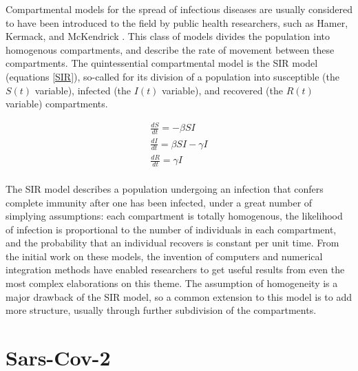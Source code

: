 Compartmental models for the spread of infectious diseases are usually considered to have been introduced to the field by public health researchers, such as Hamer, Kermack, and McKendrick \cite{hamer1906epidemic, kermack1927contribution, brauer2019mathematical,edelstein2005mathematical}. This class of models divides the population into homogenous compartments, and describe the rate of movement between these compartments. The quintessential compartmental model is the SIR model (equations \ref{SIR}), so-called for its division of a population into susceptible (the $S(t)$ variable), infected (the $I(t)$ variable), and recovered (the $R(t)$ variable) compartments.

\begin{eqnarray}
    \frac{dS}{dt} = -\beta S I  \\
    \frac{dI}{dt} = \beta S I - \gamma I\\
    \frac{dR}{dt} = \gamma I\\
    \label{SIR}
\end{eqnarray}

The SIR model describes a population undergoing an infection that confers complete immunity after one has been infected, under a great number of simplying assumptions: each compartment is totally homogenous, the likelihood of infection is proportional to the number of individuals in each compartment, and the probability that an individual recovers is constant per unit time. From the initial work on these models, the invention of computers and numerical integration methods have enabled researchers to get useful results from even the most complex elaborations on this theme. The assumption of homogeneity is a major drawback of the SIR model, so a common extension to this model is to add more structure, usually through further subdivision of the compartments. 

\section{Sars-Cov-2}

